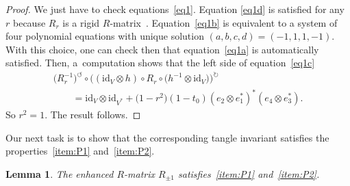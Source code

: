 \documentclass[10pt,a4paper]{amsart}
\numberwithin{equation}{section}
\newtheorem{Lemma}[Theorem]{Lemma}
\theoremstyle{definition}
\begin{document}
\begin{proof}
We just have to check equations~\eqref{eq1}. Equation \eqref{eq1d}
is satisfied for any $r$ because $R_r$ is a rigid $R$-matrix~\cite{GK:multi}.
Equation~\eqref{eq1b} is equivalent to a system of four polynomial equations
with unique solution
$(a,b,c,d) = (-1, 1, 1, -1)$.
With this choice, one can check then that equation~\eqref{eq1a} is automatically
satisfied. Then, a~computation shows that the left side of equation~\eqref{eq1c}
\begin{gather*}
\bigl(R_r^{-1}\bigr)^{\circlearrowleft} \circ \bigl((\text{id}_V \otimes h) \circ R_r
\circ \bigl(h^{-1} \otimes \text{id}_V\bigr)\bigr)^{\circlearrowright}\\
\qquad{} = \text{id}_V \otimes
\text{id}_{V^{\ast}} + \bigl(1 - r^2\bigr)(1 - t_0) (e_2 \otimes e_1^\ast)^\ast
(e_4 \otimes e_3^\ast).
\end{gather*}
So $r^2 =1$. The result follows.
\end{proof}

Our next task is to show that the corresponding tangle invariant satisfies
the properties~\eqref{item:P1} and~\eqref{item:P2}.

\begin{Lemma}\label{lem.V11}
The enhanced $R$-matrix $R_{\pm 1}$ satisfies~\eqref{item:P1} and~\eqref{item:P2}.
\end{Lemma}
\end{document}
